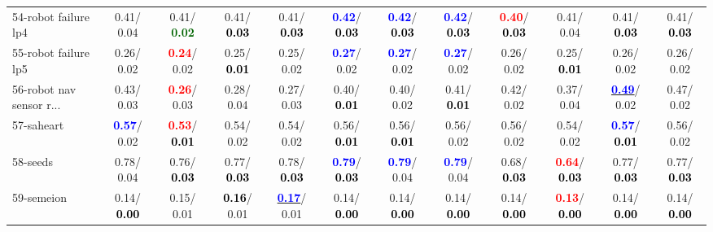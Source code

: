 \begin{table}[h]
\begin{center}
{\begin{tabular}{lc|c|c|c|c|c|c|c|c|c|c}
54-robot failure lp4 &   0.41/  0.04 &   0.41/\textcolor{darkgreen}{\textbf{  0.02}} &   0.41/\textcolor{black}{\textbf{  0.03}} &   0.41/\textcolor{black}{\textbf{  0.03}} & \textcolor{blue}{\textbf{  0.42}}/\textcolor{black}{\textbf{  0.03}} & \textcolor{blue}{\textbf{  0.42}}/\textcolor{black}{\textbf{  0.03}} & \textcolor{blue}{\textbf{  0.42}}/\textcolor{black}{\textbf{  0.03}} & \textcolor{red}{\textbf{  0.40}}/\textcolor{black}{\textbf{  0.03}} &   0.41/  0.04 &   0.41/\textcolor{black}{\textbf{  0.03}} &   0.41/\textcolor{black}{\textbf{  0.03}} \\
55-robot failure lp5 &   0.26/  0.02 & \textcolor{red}{\textbf{  0.24}}/  0.02 &   0.25/\textcolor{black}{\textbf{  0.01}} &   0.25/  0.02 & \textcolor{blue}{\textbf{  0.27}}/  0.02 & \textcolor{blue}{\textbf{  0.27}}/  0.02 & \textcolor{blue}{\textbf{  0.27}}/  0.02 &   0.26/  0.02 &   0.25/\textcolor{black}{\textbf{  0.01}} &   0.26/  0.02 &   0.26/  0.02 \\
56-robot nav sensor r... &   0.43/  0.03 & \textcolor{red}{\textbf{  0.26}}/  0.03 &   0.28/  0.04 &   0.27/  0.03 &   0.40/\textcolor{black}{\textbf{  0.01}} &   0.40/  0.02 &   0.41/\textcolor{black}{\textbf{  0.01}} &   0.42/  0.02 &   0.37/  0.04 & \underline{\textcolor{blue}{\textbf{  0.49}}}/  0.02 &   0.47/  0.02 \\
57-saheart & \textcolor{blue}{\textbf{  0.57}}/  0.02 & \textcolor{red}{\textbf{  0.53}}/\textcolor{black}{\textbf{  0.01}} &   0.54/  0.02 &   0.54/  0.02 &   0.56/\textcolor{black}{\textbf{  0.01}} &   0.56/\textcolor{black}{\textbf{  0.01}} &   0.56/  0.02 &   0.56/  0.02 &   0.54/  0.02 & \textcolor{blue}{\textbf{  0.57}}/\textcolor{black}{\textbf{  0.01}} &   0.56/  0.02 \\
58-seeds &   0.78/  0.04 &   0.76/\textcolor{black}{\textbf{  0.03}} &   0.77/\textcolor{black}{\textbf{  0.03}} &   0.78/\textcolor{black}{\textbf{  0.03}} & \textcolor{blue}{\textbf{  0.79}}/\textcolor{black}{\textbf{  0.03}} & \textcolor{blue}{\textbf{  0.79}}/  0.04 & \textcolor{blue}{\textbf{  0.79}}/  0.04 &   0.68/\textcolor{black}{\textbf{  0.03}} & \textcolor{red}{\textbf{  0.64}}/\textcolor{black}{\textbf{  0.03}} &   0.77/\textcolor{black}{\textbf{  0.03}} &   0.77/\textcolor{black}{\textbf{  0.03}} \\
59-semeion &   0.14/\textcolor{black}{\textbf{  0.00}} &   0.15/  0.01 & \textcolor{black}{\textbf{  0.16}}/  0.01 & \underline{\textcolor{blue}{\textbf{  0.17}}}/  0.01 &   0.14/\textcolor{black}{\textbf{  0.00}} &   0.14/\textcolor{black}{\textbf{  0.00}} &   0.14/\textcolor{black}{\textbf{  0.00}} &   0.14/\textcolor{black}{\textbf{  0.00}} & \textcolor{red}{\textbf{  0.13}}/\textcolor{black}{\textbf{  0.00}} &   0.14/\textcolor{black}{\textbf{  0.00}} &   0.14/\textcolor{black}{\textbf{  0.00}} \\

\end{tabular}}
\end{center}
\end{table}
